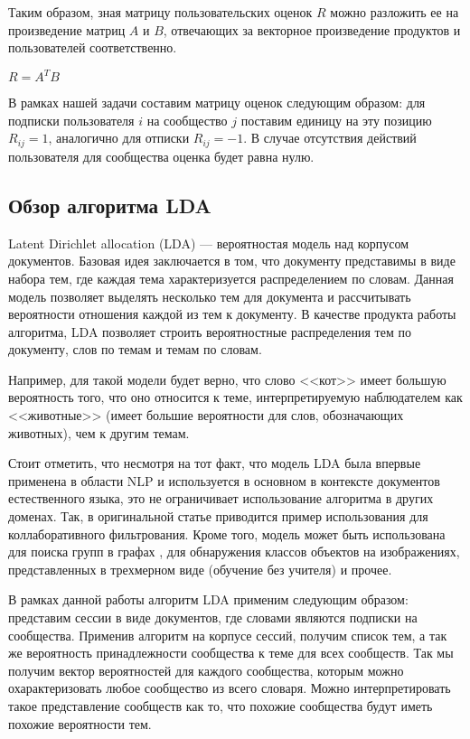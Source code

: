 \documentclass[times,specification,annotation]{itmo-student-thesis}
\begin{document}
Таким образом, зная матрицу пользовательских оценок $R$ можно разложить ее на произведение матриц $A$ и $B$, отвечающих за векторное произведение продуктов и пользователей соответственно.

$R = A^TB$

В рамках нашей задачи составим матрицу оценок следующим образом: для подписки пользователя $i$ на сообщество $j$ поставим единицу на эту позицию $R_{ij} = 1$, аналогично для отписки $R_{ij} = - 1$. В случае отсутствия действий пользователя для сообщества оценка будет равна нулю.


\subsection{Обзор алгоритма LDA}\label{sec:lda}

Latent Dirichlet allocation (LDA) \cite{lda2003} --- вероятностая модель над корпусом документов. Базовая идея заключается в том, что документу представимы в виде набора тем, где каждая тема характеризуется распределением по словам. Данная модель позволяет выделять несколько тем для документа и рассчитывать вероятности отношения каждой из тем к документу.
В качестве продукта работы алгоритма, LDA позволяет строить вероятностные распределения тем по документу, слов по темам и темам по словам.

Например, для такой модели будет верно, что слово <<кот>> имеет большую вероятность того, что оно относится к теме, интерпретируемую наблюдателем как <<животные>> (имеет большие вероятности для слов, обозначающих животных), чем к другим темам. 

Стоит отметить, что несмотря на тот факт, что модель LDA была впервые применена в области NLP и используется в основном в контексте документов естественного языка, это не ограничивает использование алгоритма в других доменах. Так, в оригинальной статье \cite{lda2003} приводится пример использования для коллаборативного фильтрования. Кроме того, модель может быть использована для поиска групп в графах \cite{Henderson2009}, для обнаружения классов объектов на изображениях, представленных в трехмерном виде (обучение без учителя) \cite{Endres2009} и прочее.

В рамках данной работы алгоритм LDA применим следующим образом: представим сессии в виде документов, где словами являются подписки на сообщества. Применив алгоритм на корпусе сессий, получим список тем, а так же вероятность принадлежности сообщества к теме для всех сообществ. Так мы получим вектор вероятностей для каждого сообщества, которым можно охарактеризовать любое сообщество из всего словаря. Можно интерпретировать такое представление сообществ как то, что похожие сообщества будут иметь похожие вероятности тем. 
 
\end{document}
